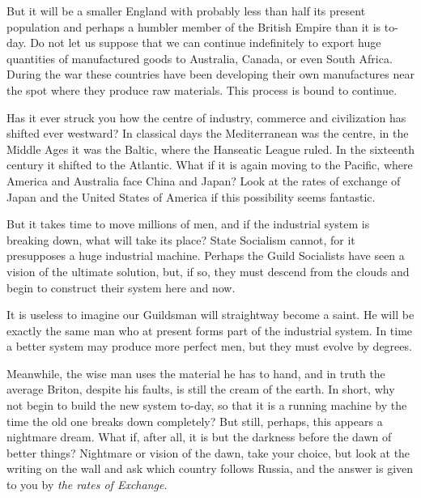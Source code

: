 \documentclass{book}
\begin{document}
But it will be a smaller England with probably less than half its present population and perhaps a humbler member of the British Empire than it is to-day. Do not let us suppose that we can continue indefinitely to export huge quantities of manufactured goods to Australia, Canada, or even South Africa. During the war these countries have been developing their own manufactures near the spot where they produce raw materials. This process is bound to continue.

Has it ever struck you how the centre of industry, commerce and civilization has shifted ever westward? In classical days the Mediterranean was the centre, in the Middle Ages it was the Baltic, where the Hanseatic League ruled. In the sixteenth century it shifted to the Atlantic. What if it is again moving to the Pacific, where America and Australia face China and Japan? Look at the rates of exchange of Japan and the United States of America if this possibility seems fantastic.

But it takes time to move millions of men, and if the industrial system is breaking down, what will take its place? State Socialism cannot, for it presupposes a huge industrial machine. Perhaps the Guild Socialists have seen a vision of the ultimate solution, but, if so, they must descend from the clouds and begin to construct their system here and now.

It is useless to imagine our Guildsman will straightway become a saint. He will be exactly the same man who at present forms part of the industrial system. In time a better system may produce more perfect men, but they must evolve by degrees.

Meanwhile, the wise man uses the material he has to hand, and in truth the average Briton, despite his faults, is still the cream of the earth. In short, why not begin to build the new system to-day, so that it is a running machine by the time the old one breaks down completely? But still, perhaps, this appears a nightmare dream. What if, after all, it is but the darkness before the dawn of better things? Nightmare or vision of the dawn, take your choice, but look at the writing on the wall and ask which country follows Russia, and the answer is given to you by \emph{the rates of Exchange}.

\end{document}
